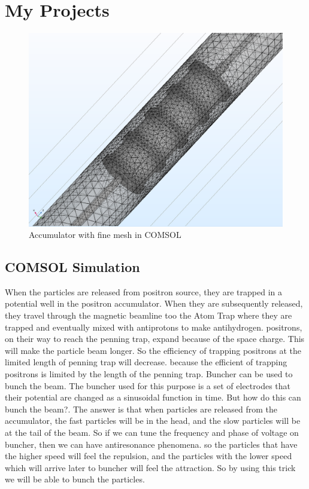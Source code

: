 \documentclass[12pt,a4paper]{article}
\begin{document}
\section{My Projects}

\begin{figure}[h]
\centering
\includegraphics[scale=0.3]{Mesh}
\caption{Accumulator with fine mesh in COMSOL}
\end{figure}

\subsection{COMSOL Simulation}
When the particles are released from positron source, they are trapped in a potential well in the positron accumulator. When they are subsequently released, they travel through the magnetic beamline too the Atom Trap where they are trapped and eventually mixed with antiprotons to make antihydrogen.  positrons, on their way to reach the penning trap, expand because of the space charge. This will make the particle beam longer. So the efficiency of trapping positrons at the limited length of penning trap will decrease. because the efficient of trapping positrons is limited by the length of the penning trap. Buncher can be used to bunch the beam. The buncher used for this purpose is a set of electrodes that their potential are changed as a sinusoidal function in time.
But how do this can bunch the beam?. The answer is that when particles are released from the accumulator, the fast particles will be in the head, and the slow particles will be at the tail of the beam. So if we can tune the frequency and phase of voltage on buncher, then we can have antiresonance phenomena. so the particles that have the higher speed will feel the repulsion, and the particles with the lower speed which will arrive later to buncher will feel the attraction.  So by using this trick we will be able to bunch the particles.
\end{document}
